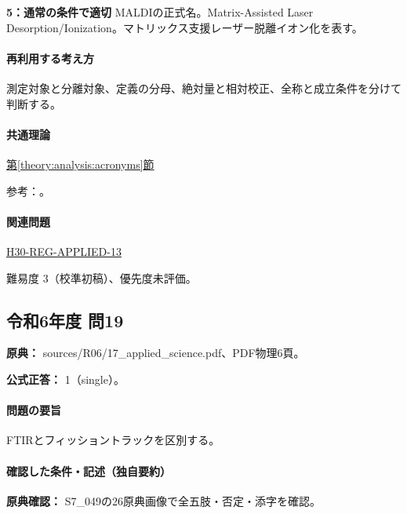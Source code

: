 \noindent\textbf{5：通常の条件で適切} MALDIの正式名。Matrix-Assisted Laser Desorption/Ionization。マトリックス支援レーザー脱離イオン化を表す。\par

\paragraph{再利用する考え方} 測定対象と分離対象、定義の分母、絶対量と相対校正、全称と成立条件を分けて判断する。

\paragraph{共通理論} \hyperref[theory:analysis:acronyms]{第\ref*{theory:analysis:acronyms}節}

\par 参考：\cite{analysis49_hplc_ref,analysis49_esr_ref,analysis49_maldi_ref,analysis49_cars_ref}。

\paragraph{関連問題} \hyperref[q:h30-reg-applied-13]{H30-REG-APPLIED-13}

\par 難易度 3（校準初稿）、優先度未評価。

\subsection{令和6年度 問19}
\label{q:r06-reg-applied-19}

\noindent\textbf{原典：} sources/R06/17\_applied\_science.pdf、PDF物理6頁。

\textbf{公式正答：} 1（single）。

\paragraph{問題の要旨} FTIRとフィッショントラックを区別する。

\paragraph{確認した条件・記述（独自要約）}\mbox{}\par

\noindent\textbf{原典確認：} S7\_049の26原典画像で全五肢・否定・添字を確認。\par

